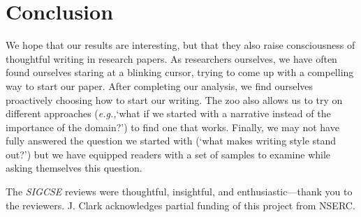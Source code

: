 \documentclass[sigconf]{acmart}
\newcommand{\eg}{\textit{e.g.,}\xspace}
\begin{document}
	\section{Conclusion}

	We hope that our results are interesting, but that they also raise consciousness of thoughtful writing in research papers. 
As researchers ourselves, we have often found ourselves staring at a blinking cursor, trying to come up with a compelling way to start our paper. After completing our analysis, we find ourselves proactively choosing how to start our writing. The zoo also allows us to try on different approaches (\eg `what if we started with a narrative instead of the importance of the domain?') to find one that works. Finally, we may not have fully answered the question we started with (`what makes writing style stand out?') but we have equipped readers with a set of samples to examine while asking themselves this question. 
	

	
\begin{acks} 

The \textit{SIGCSE} reviews were thoughtful, insightful, and enthusiastic---thank you to the reviewers. J. Clark acknowledges partial funding of this project from NSERC. 
\end{acks}


	
	
\end{document}
